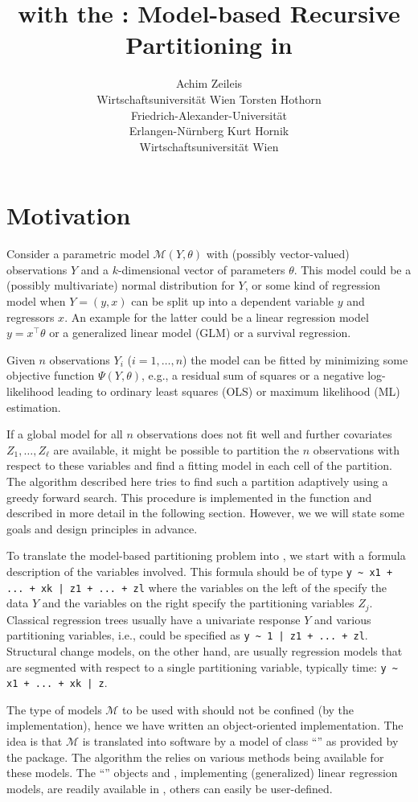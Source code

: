 \documentclass{Z}
\author{Achim Zeileis\\Wirtschaftsuniversit\"at Wien \And
        Torsten Hothorn\\Friedrich-Alexander-Universit\"at\\Erlangen-N\"urnberg \And
	Kurt Hornik\\Wirtschaftsuniversit\"at Wien}
\title{\pkg{party} with the \code{mob}: Model-based Recursive Partitioning in \proglang{R}}
\begin{document}
\section{Motivation}
\label{sec:motivation}

Consider a parametric model $\mathcal{M}(Y, \theta)$
with (possibly vector-valued) observations $Y$ and a
$k$-dimensional vector of parameters $\theta$. This model 
could be a (possibly multivariate) normal distribution for $Y$, or some
kind of regression model when $Y = (y, x)$ can be split up into a dependent variable
$y$ and regressors $x$. An example for the latter could be a linear regression
model $y = x^\top \theta$ or a generalized linear model (GLM) or a survival 
regression.

Given $n$ observations $Y_i$ ($i = 1, \dots, n$) the model can be fitted
by minimizing some objective function $\Psi(Y, \theta)$, e.g., a residual sum of squares
or a negative log-likelihood leading to ordinary least squares (OLS) or maximum
likelihood (ML) estimation.

If a global model for all $n$ observations does not fit well and further
covariates $Z_1, \dots, Z_\ell$ are available, it might be possible to partition
the $n$ observations with respect to these variables and find a fitting model
in each cell of the partition. The algorithm described here tries to find
such a partition adaptively using a greedy forward search. This procedure is
implemented in the function  and described in more detail in the following
section. However, we we will state some goals and design principles in advance.

To translate the model-based partitioning problem into , we start with
a formula description of the variables involved. This formula should be of type
\verb:y ~ x1 + ... + xk | z1 + ... + zl: where the variables on the
left of the \code{|} specify the data $Y$ and the variables on the right specify the
partitioning variables $Z_j$. Classical regression trees usually have a univariate
response $Y$ and various partitioning variables, i.e., could be specified as
\verb:y ~ 1 | z1 + ... + zl:. Structural change models, on the other hand, are usually
regression models that are segmented with respect to a single partitioning variable,
typically time: \verb:y ~ x1 + ... + xk | z:.

The type of models $\mathcal{M}$ to be used with  should not be
confined (by the implementation), hence we have written an object-oriented 
implementation. The idea is that $\mathcal{M}$ is translated into software
by a model of class ``'' as provided by the 
package. The algorithm the relies on various methods being available for these
models. The ``'' objects  and ,
implementing (generalized) linear regression models, are readily available in
, others can easily be user-defined.
\end{document}
